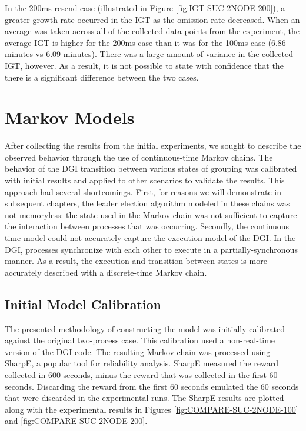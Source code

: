 In the 200ms resend case (illustrated in Figure \ref{fig:IGT-SUC-2NODE-200}), a greater growth rate occurred in the \ac{IGT} as the omission rate decreased.
When an average was taken across all of the collected data points from the experiment, the average \ac{IGT} is higher for the 200ms case than it was for the 100ms case (6.86 minutes vs 6.09 minutes).
There was a large amount of variance in the collected \ac{IGT}, however.
As a result, it is not possible to state with confidence that the there is a significant difference between the two cases.

\section{Markov Models}

After collecting the results from the initial experiments, we sought to describe the observed behavior through the use of continuous-time Markov chains.
The behavior of the DGI transition between various states of grouping was calibrated with initial results and applied to other scenarios to validate the results.
This approach had several shortcomings.
First, for reasons we will demonstrate in subsequent chapters, the leader election algorithm modeled in these chains was not memoryless: the state used in the Markov chain was not sufficient to capture the interaction between processes that was occurring.
Secondly, the continuous time model could not accurately capture the execution model of the DGI.
In the DGI, processes synchronize with each other to execute in a partially-synchronous manner.
As a result, the execution and transition between states is more accurately described with a discrete-time Markov chain.

\subsection{Initial Model Calibration}

The presented methodology of constructing the model was initially calibrated against the original two-process case.
This calibration used a non-real-time version of the DGI code.
The resulting Markov chain was processed using SharpE\cite{SHARPE}\cite{SHARPE2}, a popular tool for reliability analysis.
SharpE measured the reward collected in 600 seconds, minus the reward that was collected in the first 60 seconds. 
Discarding the reward from the first 60 seconds emulated the 60 seconds that were discarded in the experimental runs.
The SharpE results are plotted along with the experimental results in Figures \ref{fig:COMPARE-SUC-2NODE-100} and \ref{fig:COMPARE-SUC-2NODE-200}.

